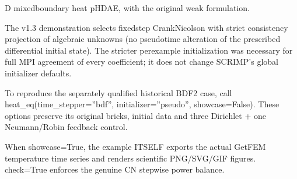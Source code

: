 \documentclass[letterpaper,10pt,english]{sphinxmanual}
\begin{document}
\begin{fulllineitems}

\pysigstartsignatures
\pysiglinewithargsret
{}
{\sphinxparamcomma {}\sphinxparamcomma {}\sphinxparamcomma {}\sphinxparamcomma {}\sphinxparamcomma {}\sphinxparamcomma {}\sphinxparamcomma {}\sphinxparamcomma {}\sphinxparamcomma {}\sphinxparamcomma {}}
{}
\pysigstopsignatures
{}\sphinxhyphen{}D mixed\sphinxhyphen{}boundary heat pH\sphinxhyphen{}DAE, with the original weak formulation.

\sphinxAtStartPar
The v1.3 demonstration selects fixed\sphinxhyphen{}step Crank\textendash{}Nicolson with
strict consistency projection of algebraic unknowns (no pseudo\sphinxhyphen{}time
alteration of the prescribed differential initial state). The
stricter per\sphinxhyphen{}example initialization was necessary for full MPI
agreement of every coefficient; it does not change SCRIMP’s
global initializer defaults.

\sphinxAtStartPar
To reproduce the separately qualified historical BDF2 case, call
heat\_eq(time\_stepper=”bdf”, initializer=”pseudo”, showcase=False).
These options preserve its original bricks, initial data and
three Dirichlet + one Neumann/Robin feedback control.

\sphinxAtStartPar
When showcase=True, the example ITSELF exports the actual GetFEM
temperature time series and renders scientific PNG/SVG/GIF figures.
check=True enforces the genuine CN stepwise power balance.

\end{fulllineitems}
\end{document}
